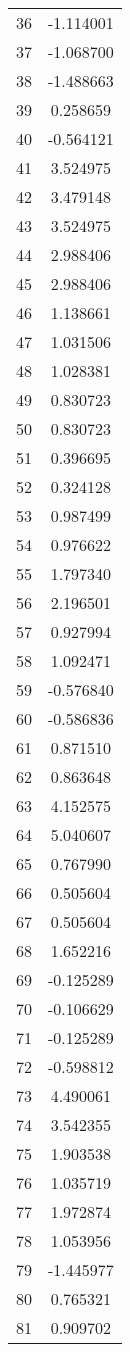 \documentclass[12pt]{article}
\begin{document}
\begin{longtable}{@{}cc@{}}
36 & -1.114001 \\
37 & -1.068700 \\
38 & -1.488663 \\
39 & 0.258659 \\
40 & -0.564121 \\
41 & 3.524975 \\
42 & 3.479148 \\
43 & 3.524975 \\
44 & 2.988406 \\
45 & 2.988406 \\
46 & 1.138661 \\
47 & 1.031506 \\
48 & 1.028381 \\
49 & 0.830723 \\
50 & 0.830723 \\
51 & 0.396695 \\
52 & 0.324128 \\
53 & 0.987499 \\
54 & 0.976622 \\
55 & 1.797340 \\
56 & 2.196501 \\
57 & 0.927994 \\
58 & 1.092471 \\
59 & -0.576840 \\
60 & -0.586836 \\
61 & 0.871510 \\
62 & 0.863648 \\
63 & 4.152575 \\
64 & 5.040607 \\
65 & 0.767990 \\
66 & 0.505604 \\
67 & 0.505604 \\
68 & 1.652216 \\
69 & -0.125289 \\
70 & -0.106629 \\
71 & -0.125289 \\
72 & -0.598812 \\
73 & 4.490061 \\
74 & 3.542355 \\
75 & 1.903538 \\
76 & 1.035719 \\
77 & 1.972874 \\
78 & 1.053956 \\
79 & -1.445977 \\
80 & 0.765321 \\
81 & 0.909702 \\

\end{longtable}
\end{document}
